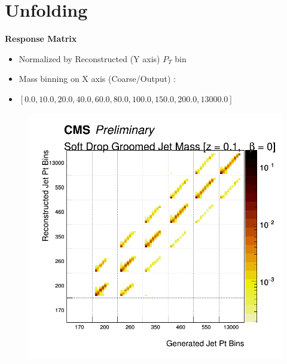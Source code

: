 \documentclass{beamer}
\begin{document}
\section{Unfolding}
\begin{frame}{\textbf{Response Matrix}}
\vspace{.5mm}

\begin{itemize}
  \item Normalized by Reconstructed (Y axis) $P_T$ bin
  \item Mass binning on X axis (Coarse/Output) :
  \item $[0.0, 10.0, 20.0, 40.0, 60.0, 80.0, 100.0, 150.0, 200.0, 13000.0]$
\end{itemize}


\begin{figure}
\centering
\includegraphics[scale=.25]{Oct31_unfoldPlots_sdB0/aResponseMatrix_NormalizedbyPtbin.png}
\end{figure}



\end{frame}
\end{document}
